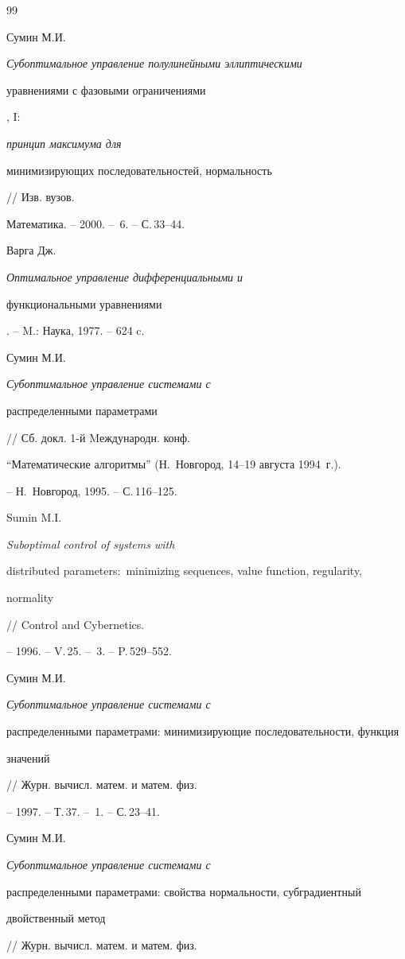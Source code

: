 \begin{thebibliography}{99}







Сумин М.И. {\em Субоптимальное управление полулинейными эллиптическими


уравнениями с фазовыми ограничениями}, I: {\em принцип максимума для


минимизирующих последовательностей, нормальность} // Изв. вузов.


Математика. -- 2000. -- \No\,6. -- С.\,33--44.




Варга Дж. {\em Оптимальное управление дифференциальными и


функциональными уравнениями}. -- M.: Наука, 1977. -- 624 c.




Сумин М.И. {\em Субоптимальное управление системами с


распределенными параметрами} // Сб. докл. 1-й Mеждународн. конф.


``Математические алгоритмы'' (Н.~Новгород, 14--19 августа 1994~г.).


-- Н.~Новгород, 1995. -- С.\,116--125.




Sumin M.I. {\em Suboptimal control of systems with


distributed parameters$:$ minimizing sequences, value function, regularity,


normality} // Control and Cybernetics.


-- 1996. -- V.\,25. -- \No\,3. -- P.\,529--552.




Сумин М.И. {\em Субоптимальное управление системами с


распределенными параметрами: минимизирующие последовательности, функция


значений} // Журн. вычисл. матем. и матем. физ.


-- 1997. -- Т.\,37. -- \No\,1. -- С.\,23--41.




Сумин М.И. {\em Субоптимальное управление системами с


распределенными параметрами: свойства нормальности, субградиентный


двойственный метод} // Журн. вычисл. матем. и матем. физ.



\end{thebibliography}
